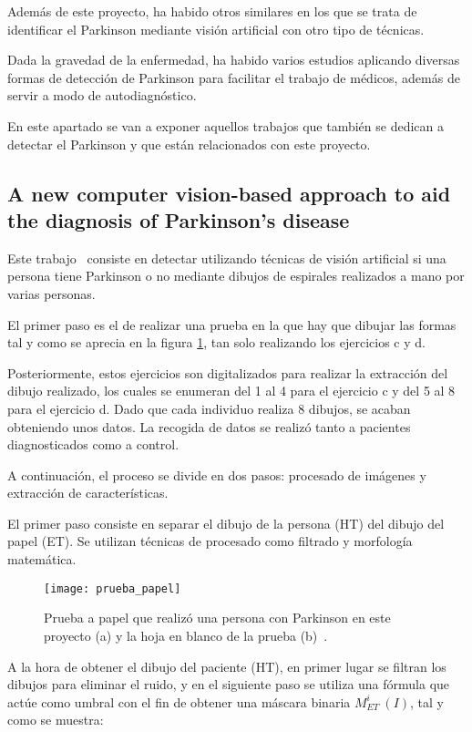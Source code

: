 Además de este proyecto, ha habido otros similares en los que se trata de identificar el Parkinson mediante visión artificial con otro tipo de técnicas.

Dada la gravedad de la enfermedad, ha habido varios estudios aplicando diversas formas de detección de Parkinson para facilitar el trabajo de médicos, además de servir a modo de autodiagnóstico.

En este apartado se van a exponer aquellos trabajos que también se dedican a detectar el Parkinson y que están relacionados con este proyecto.

\subsection{A new computer vision-based approach to aid the diagnosis of Parkinson's disease}
Este trabajo~\cite{pereira2016new} consiste en detectar utilizando técnicas de visión artificial si una persona tiene Parkinson o no mediante dibujos de espirales realizados a mano por varias personas.

El primer paso es el de realizar una prueba en la que hay que dibujar las formas tal y como se aprecia en la figura \ref{fig:pruebapapel}, tan solo realizando los ejercicios c y d.

Posteriormente, estos ejercicios son digitalizados para realizar la extracción del dibujo realizado, los cuales se enumeran del 1 al 4 para el ejercicio c y del 5 al 8 para el ejercicio d. Dado que cada individuo realiza 8 dibujos, se acaban obteniendo unos datos. La recogida de datos se realizó tanto a pacientes diagnosticados como a control.

A continuación, el proceso se divide en dos pasos: procesado de imágenes y extracción de características.

El primer paso consiste en separar el dibujo de la persona (HT) del dibujo del papel (ET). Se utilizan técnicas de procesado como filtrado y morfología matemática.

\begin{figure}[ht]
	\texttt{[image: prueba\_papel]}
	\caption{Prueba a papel que realizó una persona con Parkinson en este proyecto (a) y la hoja en blanco de la prueba (b)~\cite{pereira2016new}.}
	\label{fig:pruebapapel}
\end{figure}

A la hora de obtener el dibujo del paciente (HT), en primer lugar se filtran los dibujos para eliminar el ruido, y en el siguiente paso se utiliza una fórmula que actúe como umbral con el fin de obtener una máscara binaria \(M^{i}_{ET}\ (I)\), tal y como se muestra: 

